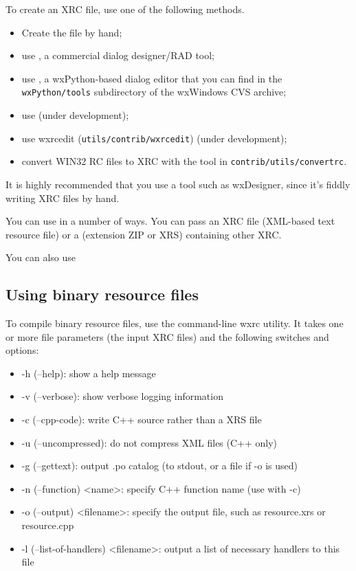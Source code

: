 To create an XRC file, use one of the following methods.

\begin{itemize}\itemsep=0pt
\item Create the file by hand;
\item use , a commercial dialog designer/RAD tool;
\item use , a wxPython-based
dialog editor that you can find in the {\tt wxPython/tools} subdirectory of the wxWindows
CVS archive;
\item use  (under development);
\item use wxrcedit ({\tt utils/contrib/wxrcedit}) (under development);
\item convert WIN32 RC files to XRC with the tool in {\tt contrib/utils/convertrc}.
\end{itemize}

It is highly recommended that you use a tool such as wxDesigner, since it's fiddly writing
XRC files by hand.

You can use  in a number of ways.
You can pass an XRC file (XML-based text resource file)
or a  (extension ZIP or XRS) containing other XRC.

You can also use 

\subsection{Using binary resource files}\label{binaryresourcefiles}

To compile binary resource files, use the command-line wxrc utility. It takes one or more file parameters
(the input XRC files) and the following switches and options:
\begin{itemize}\itemsep=0pt
\item -h (--help): show a help message
\item -v (--verbose): show verbose logging information
\item -c (--cpp-code): write C++ source rather than a XRS file
\item -u (--uncompressed): do not compress XML files (C++ only)
\item -g (--gettext): output .po catalog (to stdout, or a file if -o is used)
\item -n (--function) <name>: specify C++ function name (use with -c)
\item -o (--output) <filename>: specify the output file, such as resource.xrs or resource.cpp
\item -l (--list-of-handlers) <filename>: output a list of necessary handlers to this file
\end{itemize}

